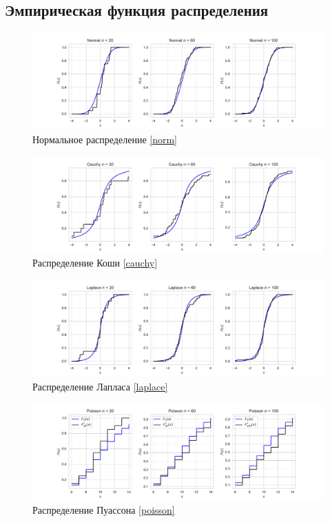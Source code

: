 \documentclass[a4paper]{article}
\begin{document}
\subsection{Эмпирическая функция распределения}
\begin{figure}[H]
    \centering
    \includegraphics[width = 16 cm]{resources/normalECDF.pdf}
    \caption{Нормальное распределение \eqref{norm}}
    \label{fig:normECDF}
\end{figure}
\begin{figure}[H]
    \centering
    \includegraphics[width = 16 cm]{resources/cauchyECDF.pdf}
    \caption{Распределение Коши \eqref{cauchy}}
    \label{fig:cauchyECDF}
\end{figure}
\begin{figure}[H]
    \centering
    \includegraphics[width = 16 cm]{resources/laplaceECDF.pdf}
    \caption{Распределение Лапласа \eqref{laplace}}
    \label{fig:laplaceECDF}
\end{figure}
\begin{figure}[H]
    \centering
    \includegraphics[width = 16 cm]{resources/poissonECDF.pdf}
    \caption{Распределение Пуассона \eqref{poisson}}
    \label{fig:poissonECDF}
\end{figure}
\end{document}
